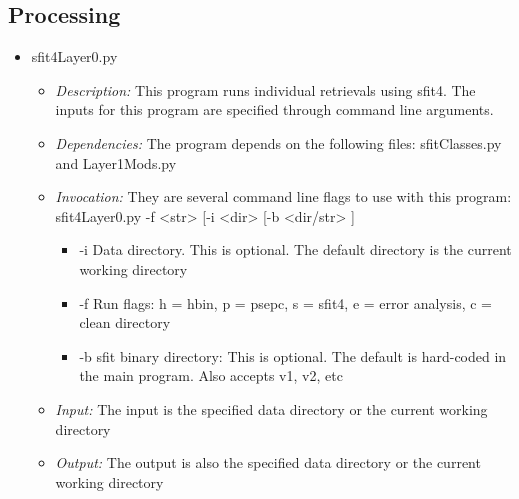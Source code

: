 \documentclass[12pt, letterpaper]{article}
\begin{document}
\subsection{Processing}
\begin{itemize}
\item sfit4Layer0.py
\begin{itemize}
\item \textit{Description:} This program runs individual retrievals using sfit4. The inputs for this program are specified through command line arguments. 
\item \textit{Dependencies:} The program depends on the following files: sfitClasses.py and Layer1Mods.py
\item \textit{Invocation:} They are several command line flags to use with this program: sfit4Layer0.py -f <str> [-i <dir> [-b <dir/str> ]
\begin{itemize}
\item -i Data directory. This is optional. The default directory is the current working directory
\item -f Run flags: h = hbin, p = psepc, s = sfit4, e = error analysis, c = clean directory
\item -b sfit binary directory: This is optional. The default is hard-coded in the main program. Also accepts v1, v2, etc
\end{itemize}
\item \textit{Input:} The input is the specified data directory or the current working directory
\item \textit{Output:} The output is also the specified data directory or the current working directory
\end{itemize}
\end{itemize}
\end{document}
